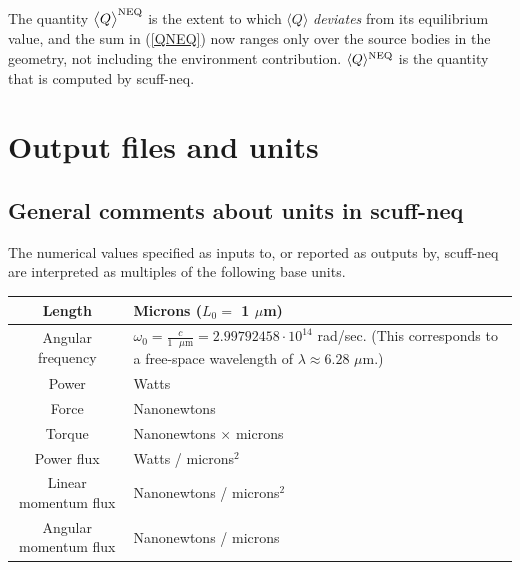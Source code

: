 \documentclass[letterpaper]{article}
\begin{document}
The quantity $\big\langle Q\big\rangle^{\text{\scriptsize NEQ}}$
is the extent to which $\big\langle Q\big\rangle$
\textit{deviates} from its equilibrium value, and
the sum in (\ref{QNEQ}) now ranges only over
the source bodies in the geometry, not including
the environment contribution.
$\langle Q \rangle^{\text{\scriptsize NEQ}}$ is the
quantity that is computed by {\sc scuff-neq}.

\newpage
\section{Output files and units}

\subsection{General comments about units in {\sc scuff-neq}}

The numerical values specified as inputs to, or reported
as outputs by, {\sc scuff-neq} are interpreted as multiples
of the following base units.

\begin{center}
\renewcommand{\arraystretch}{1.5}
\begin{tabular}{|c|p{}|}\hline
 Length            & Microns ($L_0=$ 1 $\mu$m)
\\\hline
 Angular frequency & $\omega_0=\frac{c}{1\text{ $\mu$m}}
                      =2.99792458\cdot 10^{14}$ rad/sec.
                     (This corresponds to a free-space 
                      wavelength of 
                      $\lambda\approx 6.28$ $\mu$m.)
\\\hline
 Power             & Watts 
\\\hline
 Force             & Nanonewtons
\\\hline
 Torque            & Nanonewtons $\times$ microns
\\\hline
 Power flux        & Watts / microns$^2$
\\\hline
 Linear momentum flux  & Nanonewtons / microns$^2$
\\\hline
 Angular momentum flux & Nanonewtons / microns
\\\hline
\end{tabular}
\end{center}
\renewcommand{\arraystretch}{1.0}
\end{document}
